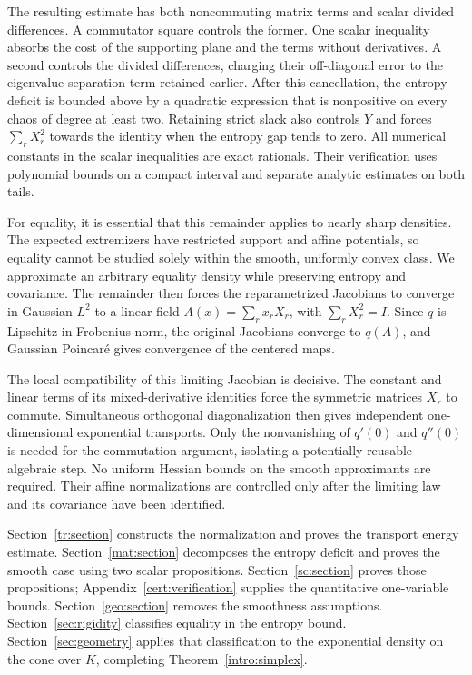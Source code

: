 The resulting estimate has both noncommuting matrix terms and scalar
divided differences.  A commutator square controls the former.
One scalar inequality absorbs the cost of the supporting plane and
the terms without derivatives.  A second controls the divided
differences, charging their off-diagonal error to the
eigenvalue-separation term retained earlier.
After this cancellation, the entropy deficit is bounded above by a
quadratic expression that is nonpositive on every chaos of degree at
least two. Retaining strict slack also controls $Y$ and forces
$\sum_rX_r^2$ towards the identity when the entropy gap tends to zero.  All numerical constants in the scalar inequalities are
exact rationals.  Their verification uses polynomial bounds on a compact
interval and separate analytic estimates on both tails.

For equality, it is essential that this remainder applies to nearly
sharp densities. The expected extremizers have restricted support and
affine potentials, so equality cannot be studied solely within the
smooth, uniformly convex class. We approximate an arbitrary equality
density while preserving entropy and covariance. The remainder then
forces the reparametrized Jacobians to converge in Gaussian $L^2$ to
a linear field $A(x)=\sum_rx_rX_r$, with $\sum_rX_r^2=I$.
Since $q$ is Lipschitz in Frobenius norm, the original Jacobians
converge to $q(A)$, and Gaussian Poincar\'e gives convergence of the
centered maps.

The local compatibility of this limiting Jacobian is decisive.
The constant and linear terms of its mixed-derivative identities
force the symmetric matrices $X_r$ to commute. Simultaneous
orthogonal diagonalization then gives independent one-dimensional
exponential transports. Only the nonvanishing of $q'(0)$ and $q''(0)$
is needed for the commutation argument, isolating a potentially
reusable algebraic step. No uniform Hessian bounds on the smooth
approximants are required. Their affine normalizations are controlled
only after the limiting law and its covariance have been identified.

Section~\ref{tr:section} constructs the normalization and proves the
transport energy estimate.  Section~\ref{mat:section} decomposes the
entropy deficit and proves the smooth case using two scalar
propositions.  Section~\ref{sc:section} proves those propositions;
Appendix~\ref{cert:verification} supplies the quantitative one-variable
bounds.  Section~\ref{geo:section} removes the smoothness assumptions.
Section~\ref{sec:rigidity} classifies equality in the entropy bound.
Section~\ref{sec:geometry} applies that classification to the exponential
density on the cone over $K$, completing Theorem~\ref{intro:simplex}.
